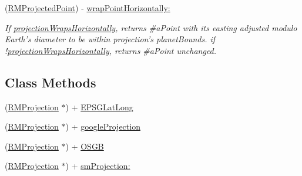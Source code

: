 \begin{DoxyCompactItemize}
(\hyperlink{struct_r_m_projected_point}{R\-M\-Projected\-Point}) -\/ \hyperlink{interface_r_m_projection_a39e2c2dd577abcdc389cd07a5e6a7e25}{wrap\-Point\-Horizontally\-:}
\begin{DoxyCompactList}\small\item\em If \hyperlink{interface_r_m_projection_aa7aa460042ee6b011d23d20cc0eb1fa9}{projection\-Wraps\-Horizontally}, returns \#a\-Point with its easting adjusted modulo Earth's diameter to be within projection's planet\-Bounds. if !\hyperlink{interface_r_m_projection_aa7aa460042ee6b011d23d20cc0eb1fa9}{projection\-Wraps\-Horizontally}, returns \#a\-Point unchanged. \end{DoxyCompactList}\end{DoxyCompactItemize}
\subsection*{Class Methods}
\begin{DoxyCompactItemize}
\item 
(\hyperlink{interface_r_m_projection}{R\-M\-Projection} $\ast$) + \hyperlink{interface_r_m_projection_a8d54612fc9b40930999b22dbf3638560}{E\-P\-S\-G\-Lat\-Long}
\item 
(\hyperlink{interface_r_m_projection}{R\-M\-Projection} $\ast$) + \hyperlink{interface_r_m_projection_a650e692e75f1b5336570a6cd28f22ca0}{google\-Projection}
\item 
(\hyperlink{interface_r_m_projection}{R\-M\-Projection} $\ast$) + \hyperlink{interface_r_m_projection_a522a3cdd02936b5088085a9477717302}{O\-S\-G\-B}
\item 
(\hyperlink{interface_r_m_projection}{R\-M\-Projection} $\ast$) + \hyperlink{interface_r_m_projection_af713cfc503b88c2f1c387423004d98a1}{sm\-Projection\-:}
\end{DoxyCompactItemize}
